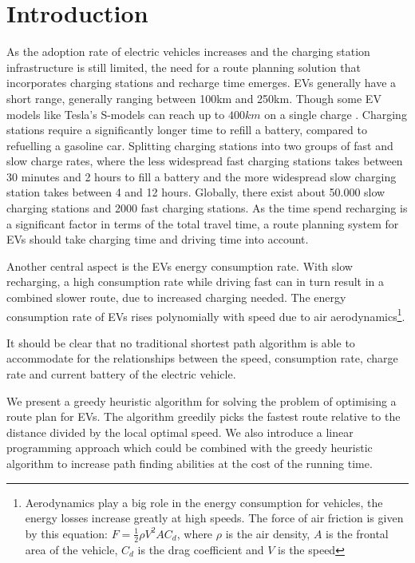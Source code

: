 \section{Introduction}

As the adoption rate of electric vehicles increases \cite{Henry2013} and the charging station infrastructure is still limited, the need for a route planning solution that incorporates charging stations and recharge time emerges. EVs generally have a short range, generally ranging between 100km and 250km. Though some EV models like Tesla's S-models can reach up to $400\si{km}$ on a single charge \cite{teslacon}. Charging stations require a significantly longer time to refill a battery, compared to refuelling a gasoline car. Splitting charging stations into two groups of fast and slow charge rates, where the less widespread fast charging stations takes between 30 minutes and 2 hours to fill a battery and the more widespread slow charging station takes between 4 and 12 hours.  Globally, there exist about 50.000 slow charging stations and 2000 fast charging stations\cite{Globalevoutlook}. As the time spend recharging is a significant factor in terms of the total travel time, a route planning system for EVs should take charging time and driving time into account.

Another central aspect is the EVs energy consumption rate. With slow recharging, a high consumption rate while driving fast can in turn result in a combined slower route, due to increased charging needed. The energy consumption rate of EVs rises polynomially with speed due to air aerodynamics\footnote{Aerodynamics play a big role in the energy consumption for vehicles, the energy losses increase greatly at high speeds. The force of air friction is given by this equation: $F = \frac{1}{2} \rho V^2 A C_d$, where $\rho$ is the air density, $A$ is the frontal area of the vehicle, $C_d$ is the drag coefficient and $V$ is the speed}.

It should be clear that no traditional shortest path algorithm is able to accommodate for the relationships between the speed, consumption rate, charge rate and current battery of the electric vehicle. 

We present a greedy heuristic algorithm for solving the problem of optimising a route plan for EVs. The algorithm greedily picks the fastest route relative to the distance divided by the local optimal speed. We also introduce a linear programming approach which could be combined with the greedy heuristic algorithm to increase path finding abilities at the cost of the running time.

